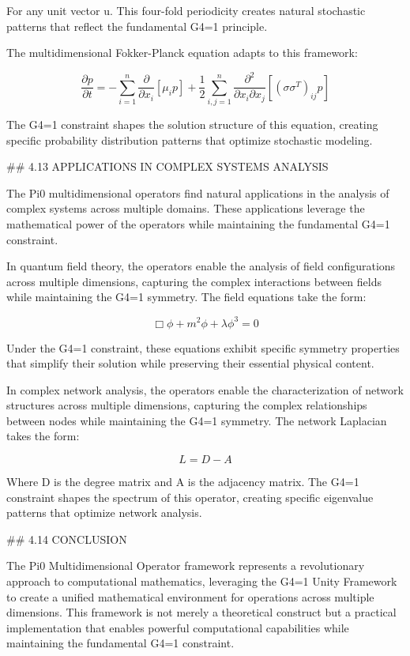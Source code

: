 For any unit vector u⃗. This four-fold periodicity creates natural stochastic patterns that reflect the fundamental G4=1 principle.

The multidimensional Fokker-Planck equation adapts to this framework:

$$\frac{\partial p}{\partial t} = -\sum_{i=1}^n \frac{\partial}{\partial x_i}[\mu_i p] + \frac{1}{2}\sum_{i,j=1}^n \frac{\partial^2}{\partial x_i \partial x_j}[(\sigma\sigma^T)_{ij} p]$$

The G4=1 constraint shapes the solution structure of this equation, creating specific probability distribution patterns that optimize stochastic modeling.

## 4.13 APPLICATIONS IN COMPLEX SYSTEMS ANALYSIS

The Pi0 multidimensional operators find natural applications in the analysis of complex systems across multiple domains. These applications leverage the mathematical power of the operators while maintaining the fundamental G4=1 constraint.

In quantum field theory, the operators enable the analysis of field configurations across multiple dimensions, capturing the complex interactions between fields while maintaining the G4=1 symmetry. The field equations take the form:

$$\Box \phi + m^2 \phi + \lambda \phi^3 = 0$$

Under the G4=1 constraint, these equations exhibit specific symmetry properties that simplify their solution while preserving their essential physical content.

In complex network analysis, the operators enable the characterization of network structures across multiple dimensions, capturing the complex relationships between nodes while maintaining the G4=1 symmetry. The network Laplacian takes the form:

$$L = D - A$$

Where D is the degree matrix and A is the adjacency matrix. The G4=1 constraint shapes the spectrum of this operator, creating specific eigenvalue patterns that optimize network analysis.

## 4.14 CONCLUSION

The Pi0 Multidimensional Operator framework represents a revolutionary approach to computational mathematics, leveraging the G4=1 Unity Framework to create a unified mathematical environment for operations across multiple dimensions. This framework is not merely a theoretical construct but a practical implementation that enables powerful computational capabilities while maintaining the fundamental G4=1 constraint.

